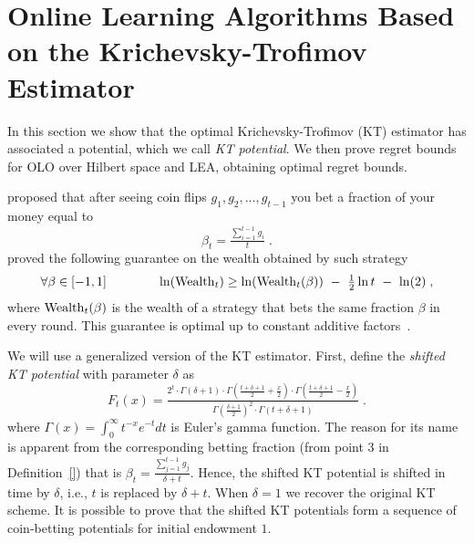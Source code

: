 \section{Online Learning Algorithms Based on the Krichevsky-Trofimov Estimator}
\label{section:kt-estimator}

In this section we show that the optimal Krichevsky-Trofimov (KT) estimator has associated a potential, which we call \emph{KT potential}.
We then prove regret bounds for \ac{OLO} over Hilbert space and \ac{LEA}, obtaining optimal regret bounds.


\citet{Krichevsky-Trofimov-1981} proposed that after seeing coin flips $g_1, g_2, \dots, g_{t-1}$ you bet a fraction of your money equal to
\begin{equation}
\label{equation:kt-estimator-betting-strategy}
\beta_t =  \tfrac{\sum_{i=1}^{t-1} g_i}{t} \; .
\end{equation}
\citeauthor{Krichevsky-Trofimov-1981} proved the following guarantee on the wealth obtained by such strategy
$$
\forall \beta \in [-1,1] \qquad \qquad \ln(\Wealth_t) \ge \ln(\Wealth_t(\beta)) \ - \ \tfrac{1}{2} \ln t \ - \ \ln(2) \; ,
$$
where $\operatorname{Wealth}_t(\beta)$ is the wealth of a strategy that bets the same fraction
$\beta$ in every round. This guarantee is optimal up to constant additive factors~\citep{Cesa-Bianchi-Lugosi-2006}.

We will use a generalized version of the KT estimator.
First, define the \emph{shifted KT potential} with parameter $\delta$ as
$$
F_t(x) = \tfrac{2^t \cdot \Gamma\left(\delta + 1 \right) \cdot \Gamma\left(\tfrac{t+\delta+1}{2} + \tfrac{x}{2} \right) \cdot \Gamma\left(\tfrac{t+\delta+1}{2} - \tfrac{x}{2} \right)}{\Gamma\left(\tfrac{\delta+1}{2} \right)^2 \cdot \Gamma \left(t+\delta+1\right)} \; .
$$
where $\Gamma(x) = \int_0^\infty t^{-x} e^{-t} dt$ is Euler's gamma function.
The reason for its name is apparent from the corresponding betting fraction (from point 3 in Definition~\ref{}) that is
$\beta_t = \tfrac{\sum_{j=1}^{t-1} g_j}{\delta+t}$.
Hence, the shifted KT potential is shifted in time by $\delta$, i.e., $t$ is replaced by $\delta+t$.
When $\delta=1$ we recover the original KT scheme.
It is possible to prove that the shifted KT potentials form a sequence of coin-betting potentials for initial endowment $1$.





